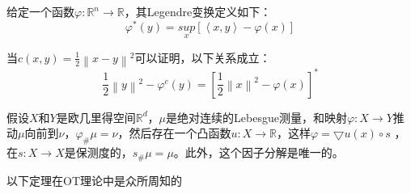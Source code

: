\begin{definition}[Legendre变换]
	给定一个函数$\varphi : \mathbb{R}^n \to \mathbb{R}$，其Legendre变换定义如下：
	\begin{equation}
		\varphi ^*(y)=\underset{x}{sup}\left [ \left \langle x,y \right \rangle -\varphi (x) \right ]  
		\label{function:14}
	\end{equation}

	当$c(x,y)=\frac{1}{2} \left \| x-y \right \| ^2 $可以证明，以下关系成立：
	\begin{equation}
		\frac{1}{2}\left \| y \right \|^2-\varphi ^c (y)=\left [ \frac{1}{2} \left \| x \right \| ^2-\varphi (x) \right ]^*  
		\label{function:15}
	\end{equation}
	\label{definition:3.4}
\end{definition}

\begin{theorem}[Briener极性因子分解【44】]
	假设$X$和$Y$是欧几里得空间$\mathbb{R}^d$，$\mu$是绝对连续的Lebesgue测量，和映射$\varphi : X\to Y$推动$\mu$向前到$\nu$，$\varphi _{\#}\mu=\nu$，然后存在一个凸函数$u: X \to \mathbb{R}$，这样$\varphi=\bigtriangledown u(x)\circ s $ ，在$s: X \to X$是保测度的，$s_{\#}\mu=\mu$。此外，这个因子分解是唯一的。
	\label{theorem:3.2}
\end{theorem}

以下定理在OT理论中是众所周知的